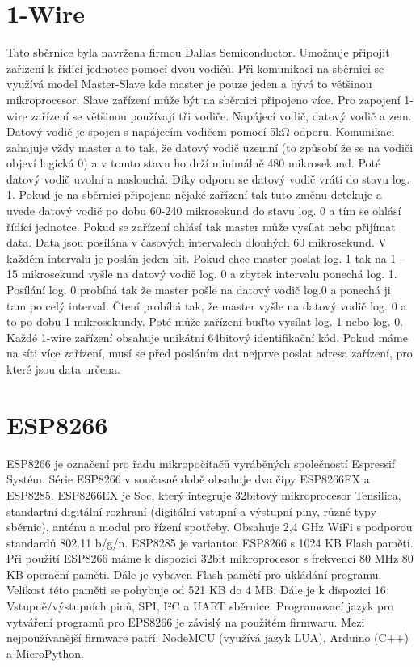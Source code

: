 \documentclass[a4paper,12pt,czech,bibliography=totoc]{scrbook}
\begin{document}
\section{1-Wire}
Tato sběrnice byla navržena firmou Dallas Semiconductor. Umožnuje připojit zařízení k řídící jednotce pomocí dvou vodičů. Při komunikaci na sběrnici se využívá model Master-Slave kde master je pouze jeden a bývá to většinou mikroprocesor. Slave zařízení může být na sběrnici připojeno více. Pro zapojení 1-wire zařízení se většinou používají tři vodiče. Napájecí vodič, datový vodič a zem. Datový vodič je spojen s napájecím vodičem pomocí 5kΩ odporu. 
\newline
Komunikaci zahajuje vždy master a to tak, že datový vodič uzemní (to způsobí že se na vodiči objeví logická 0) a v tomto stavu ho drží minimálně 480 mikrosekund. Poté datový vodič uvolní a naslouchá. Díky odporu se datový vodič vrátí do stavu log. 1. Pokud je na sběrnici připojeno nějaké zařízení tak tuto změnu detekuje a uvede datový vodič po dobu 60-240 mikrosekund do stavu log. 0 a tím se ohlásí řídící jednotce. Pokud se zařízení ohlásí tak master může vysílat nebo přijímat data.
\newline
Data jsou posílána v časových intervalech dlouhých 60 mikrosekund. V každém intervalu je poslán jeden bit. Pokud chce master poslat log. 1 tak na 1 – 15 mikrosekund vyšle na datový vodič log. 0 a zbytek intervalu ponechá log. 1.  Posílání log. 0 probíhá tak že master pošle na datový vodič log.0 a ponechá ji tam po celý interval.
\newline
Čtení probíhá tak, že master vyšle na datový vodič log. 0 a to po dobu 1 mikrosekundy. Poté může zařízení buďto vysílat log. 1 nebo log. 0.
\newline
Každé 1-wire zařízení obsahuje unikátní 64bitový identifikační kód. Pokud máme na síti více zařízení, musí se před posláním dat nejprve poslat adresa zařízení, pro které jsou data určena. 
\section{ESP8266}
ESP8266 je označení pro řadu mikropočítačů vyráběných společností Espressif Systém. Série ESP8266 v současné době obsahuje dva čipy ESP8266EX a ESP8285.
\newline
ESP8266EX je Soc, který integruje 32bitový mikroprocesor Tensilica, standartní digitální rozhraní (digitální vstupní a výstupní piny, různé typy sběrnic), anténu a modul pro řízení spotřeby. Obsahuje 2,4 GHz WiFi s podporou standardů 802.11 b/g/n.
 \newline
ESP8285 je variantou ESP8266 s 1024 KB Flash pamětí.
 \newline
Při použití ESP8266 máme k dispozici 32bit mikroprocesor s frekvencí 80 MHz 80 KB operační paměti. Dále je vybaven Flash pamětí pro ukládání programu. Velikost této paměti se pohybuje od 521 KB do 4 MB. Dále je k dispozici 16 Vstupně/výstupních pinů, SPI, I²C a UART sběrnice. 
\newline
Programovací jazyk pro vytváření programů pro EPS8266 je závislý na použitém firmwaru. Mezi nejpoužívanější firmware patří: NodeMCU (využívá jazyk LUA), Arduino (C++) a MicroPython.
\end{document}
